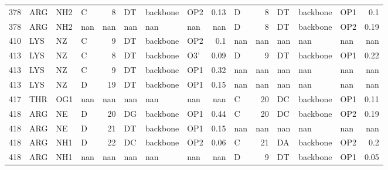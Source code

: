 \begin{longtable}{rlllrlllrlrlllr}
       378 & ARG        & NH2    & C         &           8 & DT           & backbone    & OP2      &          0.13 & D         &           8 & DT           & backbone    & OP1      &          0.1  \\
       378 & ARG        & NH2    & nan       &         nan & nan          & nan         & nan      &        nan    & D         &           8 & DT           & backbone    & OP2      &          0.19 \\
       410 & LYS        & NZ     & C         &           9 & DT           & backbone    & OP2      &          0.1  & nan       &         nan & nan          & nan         & nan      &        nan    \\
       413 & LYS        & NZ     & C         &           8 & DT           & backbone    & O3'      &          0.09 & D         &           9 & DT           & backbone    & OP1      &          0.22 \\
       413 & LYS        & NZ     & C         &           9 & DT           & backbone    & OP1      &          0.32 & nan       &         nan & nan          & nan         & nan      &        nan    \\
       413 & LYS        & NZ     & D         &          19 & DT           & backbone    & OP1      &          0.15 & nan       &         nan & nan          & nan         & nan      &        nan    \\
       417 & THR        & OG1    & nan       &         nan & nan          & nan         & nan      &        nan    & C         &          20 & DC           & backbone    & OP1      &          0.11 \\
       418 & ARG        & NE     & D         &          20 & DG           & backbone    & OP1      &          0.44 & C         &          20 & DC           & backbone    & OP2      &          0.19 \\
       418 & ARG        & NE     & D         &          21 & DT           & backbone    & OP1      &          0.15 & nan       &         nan & nan          & nan         & nan      &        nan    \\
       418 & ARG        & NH1    & D         &          22 & DC           & backbone    & OP2      &          0.06 & C         &          21 & DA           & backbone    & OP2      &          0.2  \\
       418 & ARG        & NH1    & nan       &         nan & nan          & nan         & nan      &        nan    & D         &           9 & DT           & backbone    & OP1      &          0.05 \\

\end{longtable}
